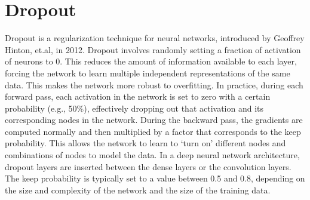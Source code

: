 \section{Dropout}
\vspace{-18pt}
Dropout is a regularization technique for neural networks, introduced by Geoffrey Hinton, et.al, in 2012. Dropout involves randomly setting a fraction of activation of neurons to 0. This reduces the amount of information available to each layer, forcing the network to learn multiple independent representations of the same data. This makes the network more robust to overfitting. In practice, during each forward pass, each activation in the network is set to zero with a certain probability (e.g., 50\%), effectively dropping out that activation and its corresponding nodes in the network. During the backward pass, the gradients are computed normally and then multiplied by a factor that corresponds to the keep probability. This allows the network to learn to ‘turn on’ different nodes and combinations of nodes to model the data. In a deep neural network architecture, dropout layers are inserted between the dense layers or the convolution layers. The keep probability is typically set to a value between 0.5 and 0.8, depending on the size and complexity of the network and the size of the training data.
